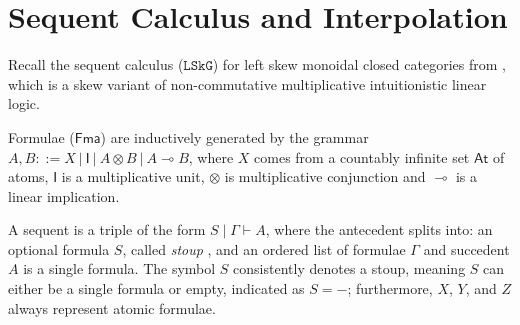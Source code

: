 \documentclass[submission,copyright,creativecommons]{eptcs}
\theoremstyle{definition}
\newcommand{\ot}{\otimes}
\newcommand{\lolli}{\multimap}
\newcommand{\I}{\mathsf{I}}
\newcommand{\vdG}{\vdash}
\newcommand{\LSkG}{$\mathtt{LSkG}$}
\newcommand{\SkBiCT}{$\mathtt{SkBiCT}$}
\newcommand{\SkBiCA}{$\mathtt{SkBiCA}$}
\newcommand{\mf}[1]{\mathsf{#1}}
\begin{document}

\section{Sequent Calculus and Interpolation}\label{sec:syntax}
Recall the sequent calculus (\LSkG) for left skew monoidal closed categories from \cite{UVW:protsn}, which is a skew variant of non-commutative multiplicative intuitionistic linear logic.

Formulae ($\mf{Fma}$) are inductively generated by the grammar $A, B::= X \ | \ \I \ | \ A \ot B \ | \ A \lolli B$, where $X$ comes from a countably infinite set $\mathsf{At}$ of atoms, $\I$ is a multiplicative unit, $\ot$ is multiplicative conjunction and $\lolli$ is a linear implication.

A sequent is a triple of the form $S \mid \Gamma \vdG A$, where the antecedent splits into: an optional formula $S$, called \emph{stoup} \cite{girard:constructive:91}, and an ordered list of formulae $\Gamma$ and succedent $A$ is a single formula.
The symbol $S$ consistently denotes a stoup, meaning $S$ can either be a single formula or empty, indicated as $S = {-}$; furthermore, $X$, $Y$, and $Z$ always represent atomic formulae.
\end{document}
